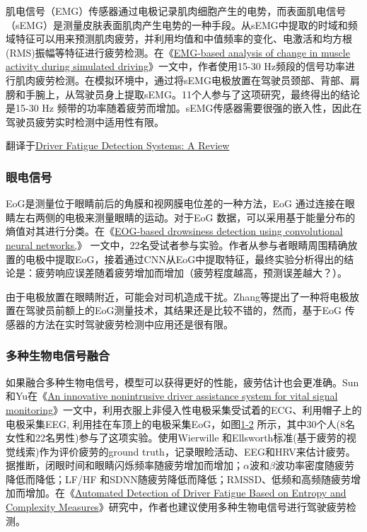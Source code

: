 肌电信号（EMG）传感器通过电极记录肌肉细胞产生的电势，而表面肌电信号（sEMG）是测量皮肤表面肌肉产生电势的一种手段。从sEMG中提取的时域和频域特征可以用来预测肌肉疲劳，并利用均值和中值频率的变化、电激活和均方根(RMS)振幅等特征进行疲劳检测。在《\href{https://xueshu.baidu.com/usercenter/paper/show?paperid=243e90cdbefb97cf245f038386f0da1a&site=xueshu_se&hitarticle=1}{EMG-based analysis of change in muscle activity during simulated driving}》一文中，作者使用15-30 Hz频段的信号功率进行肌肉疲劳检测。在模拟环境中，通过将sEMG电极放置在驾驶员颈部、背部、肩膀和手腕上，从驾驶员身上提取sEMG。11个人参与了这项研究，最终得出的结论是15-30 Hz 频带的功率随着疲劳而增加。sEMG传感器需要很强的嵌入性，因此在驾驶员疲劳实时检测中适用性有限。

翻译于\href{https://xueshu.baidu.com/usercenter/paper/show?paperid=1r7a06p0ve7m08y0s32w0jq04r498130&site=xueshu_se}{Driver Fatigue Detection Systems: A Review}

\subsubsection{眼电信号}

EoG是测量位于眼睛前后的角膜和视网膜电位差的一种方法，EoG 通过连接在眼睛左右两侧的电极来测量眼睛的运动。对于EoG 数据，可以采用基于能量分布的熵值对其进行分类。在《\href{https://xueshu.baidu.com/usercenter/paper/show?paperid=8c21b4420996c3c1d4b4584356cdd59a&site=xueshu_se&hitarticle=1}{EOG-based drowsiness detection using convolutional neural networks,}》 一文中，22名受试者参与实验。作者从参与者眼睛周围精确放置的电极中提取EoG，接着通过CNN从EoG中提取特征，最终实验分析得出的结论是：疲劳响应误差随着疲劳增加而增加（疲劳程度越高，预测误差越大？）。

由于电极放置在眼睛附近，可能会对司机造成干扰。Zhang等提出了一种将电极放置在驾驶员前额上的EoG测量技术，其结果还是比较不错的，然而，基于EoG 传感器的方法在实时驾驶疲劳检测中应用还是很有限。

\subsubsection{多种生物电信号融合}

如果融合多种生物电信号，模型可以获得更好的性能，疲劳估计也会更准确。Sun和Yu在《\href{https://xueshu.baidu.com/usercenter/paper/show?paperid=43e8f07b1c090997f279272a41f920c9&site=xueshu_se&hitarticle=1}{An innovative nonintrusive driver assistance
system for vital signal monitoring}》一文中，利用衣服上非侵入性电极采集受试着的ECG、利用帽子上的电极采集EEG, 利用挂在车顶上的电极采集EoG，如图\href{fig:1-2}{1-2} 所示，其中30个人(8名女性和22名男性)参与了这项实验。使用Wierwille 和Ellsworth标准(基于疲劳的视觉线索)作为评价疲劳的ground truth，记录眼睑活动、EEG和HRV来估计疲劳。据推断，闭眼时间和眼睛闪烁频率随疲劳增加而增加；$\alpha$波和$\beta$波功率密度随疲劳降低而降低；LF/HF 和SDNN随疲劳降低而降低；RMSSD、低频和高频随疲劳增加而增加。在《\href{https://xueshu.baidu.com/usercenter/paper/show?paperid=72e4bf79735d66cef42a2f56c6bdb211&site=xueshu_se&hitarticle=1}{Automated Detection of Driver Fatigue Based on Entropy and Complexity Measures}》研究中，作者也建议使用多种生物电信号进行驾驶疲劳检测。

